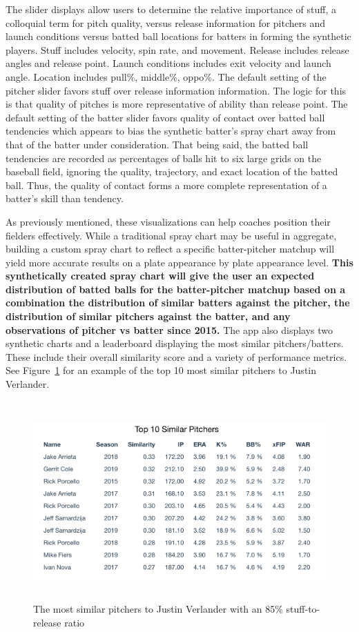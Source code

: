 \documentclass[11pt]{article}
\begin{document}

The slider displays allow users to determine the relative importance of stuff, a colloquial term for pitch quality, versus release information for pitchers and launch conditions versus batted ball locations for batters in forming the synthetic players. Stuff includes velocity, spin rate, and movement. Release includes release angles and release point. Launch conditions includes exit velocity and launch angle. Location includes pull\%, middle\%, oppo\%. The default setting of the pitcher slider favors stuff over release information information. The logic for this is that quality of pitches is more representative of ability than release point. The default setting of the batter slider favors quality of contact over batted ball tendencies which appears to bias the synthetic batter's spray chart away from that of the batter under consideration. That being said, the batted ball tendencies are recorded as percentages of balls hit to six large grids on the baseball field, ignoring the quality, trajectory, and exact location of the batted ball. Thus, the quality of contact forms a more complete representation of a batter's skill than tendency.

As previously mentioned, these visualizations can help coaches position their fielders effectively. While a traditional spray chart may be useful in aggregate, building a custom spray chart to reflect a specific batter-pitcher matchup will yield more accurate results on a plate appearance by plate appearance level. \textbf{This synthetically created spray chart will give the user an expected distribution of batted balls for the batter-pitcher matchup based on a combination the distribution of similar batters against the pitcher, the distribution of similar pitchers against the batter, and any observations of pitcher vs batter since 2015.} The app also displays two synthetic charts and a leaderboard displaying the most similar pitchers/batters. These include their overall similarity score and a variety of performance metrics. See Figure~\ref{synthpitcher} for an example of the top 10 most similar pitchers to Justin Verlander.


\begin{figure}
\centering
    \includegraphics[width=6in, height=3in]{verlander_similar.png}
    \caption{The most similar pitchers to Justin Verlander with an 85\% stuff-to-release ratio}
    \label{synthpitcher}
\end{figure}
\end{document}
